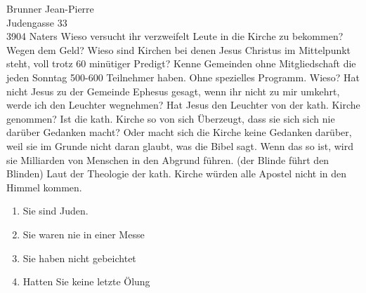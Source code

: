 \documentclass[
    12pt,
    a4paper,
    letter,
    parskip=yes,
    ]{scrlttr2}
\begin{document}
\begin{letter}{
Brunner Jean-Pierre\\
Judengasse 33\\
3904 Naters}
Wieso versucht ihr verzweifelt Leute in die Kirche zu bekommen? Wegen dem Geld? Wieso sind Kirchen bei denen Jesus Christus im Mittelpunkt steht, voll trotz 60 minütiger Predigt? Kenne Gemeinden ohne Mitgliedschaft die jeden Sonntag 500-600 Teilnehmer haben. Ohne spezielles Programm. Wieso? Hat nicht Jesus zu der Gemeinde Ephesus gesagt, wenn ihr nicht zu mir umkehrt, werde ich den Leuchter wegnehmen? Hat Jesus den Leuchter von der kath. Kirche genommen? Ist die kath. Kirche so von sich Überzeugt, dass sie sich sich nie darüber Gedanken macht? Oder macht sich die Kirche keine Gedanken darüber, weil sie im Grunde nicht daran glaubt, was die Bibel sagt. Wenn das so ist, wird sie Milliarden von Menschen in den Abgrund führen. (der Blinde führt den Blinden) Laut der Theologie der kath. Kirche würden alle Apostel nicht in den Himmel kommen. 
\begin{enumerate}
    \item Sie sind Juden.
    \item Sie waren nie in einer Messe
    \item Sie haben nicht gebeichtet
    \item Hatten Sie keine letzte Ölung
\end{enumerate}

\end{letter}
\end{document}
